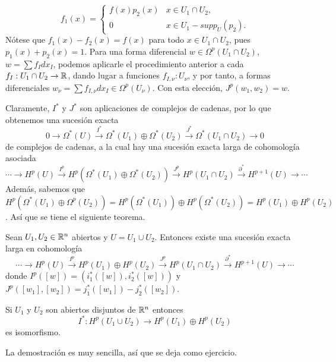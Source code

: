 \documentclass[CV.tex]{subfiles}
\begin{document}
\begin{dem}
\[
f_1(x)=\begin{cases}
f(x)p_2(x) & x\in U_1\cap U_2,\\
0 & x\in U_1-supp_U(p_2).
\end{cases}
\]
Nótese que $f_1(x)-f_2(x)=f(x)$ para todo $x\in U_1\cap U_2$, pues $p_1(x)+p_2(x)=1$. Para una forma diferencial $w\in \Omega^p(U_1\cap U_2)$, $w=\sum f_Idx_I$, podemos aplicarle el procedimiento anterior a cada $f_I:U_1\cap U_2\to\mathbb{R}$, dando lugar a funciones $f_{I,\nu}:U_{\nu}$, y por tanto, a formas diferenciales $w_{\nu}=\sum f_{I,\nu}dx_I\in\Omega^p(U_{\nu})$. Con esta elección, $J^p(w_1,w_2)=w$. 
\QED
\end{dem}

Claramente, $I^*$ y $J^*$ son aplicaciones de complejos de cadenas, por lo que obtenemos una sucesión exacta
\[
0\to \Omega^*(U)\overset{I^*}{\to}\Omega^*(U_1)\oplus\Omega^*(U_2)\overset{J^*}{\to}\Omega^*(U_1\cap U_2)\to 0
\]
de complejos de cadenas, a la cual hay una sucesión exacta larga de cohomología asociada
\[
\cdots\to H^p(U)\overset{I^p}{\to}H^p(\Omega^*(U_1)\oplus \Omega^*(U_2))\overset{J^p}{\to}H^p(U_1\cap U_2)\overset{\partial^*}{\to}H^{p+1}(U)\to \cdots
\]
Además, sabemos que $H^p(\Omega^*(U_1)\oplus \Omega^p(U_2))=H^p(\Omega^*(U_1))\oplus H^p(\Omega^*(U_2))=H^p(U_1)\oplus H^p(U_2)$. Así que se tiene el siguiente teorema.

\begin{teorema} Sean $U_1,U_2\in\mathbb{R}^n$ abiertos y $U=U_1\cup U_2$. Entonces existe una sucesión exacta larga en cohomología
\[
\cdots\to H^p(U)\overset{I^p}{\to}H^p(U_1)\oplus H^p(U_2)\overset{J^p}{\to}H^p(U_1\cap U_2)\overset{\partial^*}{\to}H^{p+1}(U)\to \cdots
\]
donde $I^p([w])=(i_1^*([w]), i_2^*([w]))$ y $J^p([w_1],[w_2])=j_1^*([w_1])-j_2^*([w_2])$.
\end{teorema}

\begin{coro}\label{coro}
Si $U_1$ y $U_2$ son abiertos disjuntos de $\mathbb{R}^n$ entonces
\[
I^*: H^p(U_1\cup U_2)\to H^p(U_1)\oplus H^p(U_2)
\]
es isomorfismo.
\end{coro}

La demostración es muy sencilla, así que se deja como ejercicio.
\end{document}
